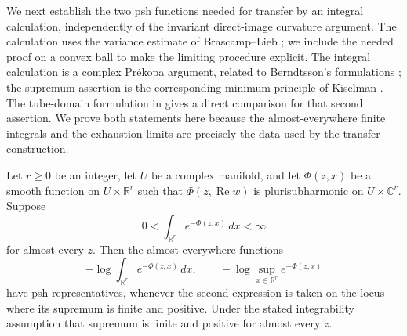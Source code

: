 We next establish the two psh functions needed for transfer by an
integral calculation, independently of the invariant direct-image
curvature argument.  The calculation uses the variance estimate of
Brascamp--Lieb \cite{BrascampLieb1976}; we include the needed proof on a
convex ball to make the limiting procedure explicit.
The integral calculation is a complex Pr\'ekopa argument, related to
Berndtsson's formulations \cite{Berndtsson1998,Berndtsson2006}; the
supremum assertion is the corresponding minimum principle of Kiselman
\cite{Kiselman1978}. The tube-domain formulation in
\cite[Theorem~1.1]{DengWangZhangZhou2018} gives a direct comparison for
that second assertion. We prove both statements here because the
almost-everywhere finite integrals and the exhaustion limits are
precisely the data used by the transfer construction.

\begin{lemma}\label{g:prekopa}\label{rb:prekopa}
Let $r\geq0$ be an integer, let $U$ be a complex manifold, and let $\Phi(z,x)$ be a smooth function
on $U\times\mathbb R^r$ such that $\Phi(z,\operatorname{Re}w)$ is
plurisubharmonic on $U\times\mathbb C^r$.  Suppose
\[
                     0<\int_{\mathbb R^r}e^{-\Phi(z,x)}\,dx<\infty
\]
for almost every $z$.  Then the almost-everywhere functions
\[
 -\log\int_{\mathbb R^r}e^{-\Phi(z,x)}\,dx,
 \qquad
 -\log\sup_{x\in\mathbb R^r}e^{-\Phi(z,x)}
\]
have psh representatives, whenever the second expression is taken on
the locus where its supremum is finite and positive.  Under the stated
integrability assumption that supremum is finite and positive for
almost every $z$.
\end{lemma}

